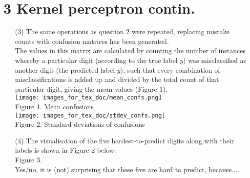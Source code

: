 \documentclass[a4paper,12pt]{article}
\begin{document}
\section*{3 Kernel perceptron contin.}
\begin{enumerate}

\item[(3)]
The same operations as question 2 were repeated, replacing mistake counts with confusion matrices has been generated. \\
The values in this matrix are calculated by counting the number of instances whereby a particular digit (according to the true label $y$) was misclassified as another digit (the predicted label $y$), such that every combination of misclassifications is added up and divided by the total count of that particular digit, giving the mean values (Figure 1). \\
\texttt{[image: images\_for\_tex\_doc/mean\_confs.png]}\\
Figure 1. Mean confusions \\
\texttt{[image: images\_for\_tex\_doc/stdev\_confs.png]}\\
Figure 2. Standard deviations of confusions\\

\item[(4)]
The visualisation of the five hardest-to-predict digits along with their labels is shown in Figure 2 below: \\
Figure 3.\\
Yes/no, it is (not) surprising that these five are hard to predict, because.... 

\end{enumerate}
\clearpage
\end{document}
